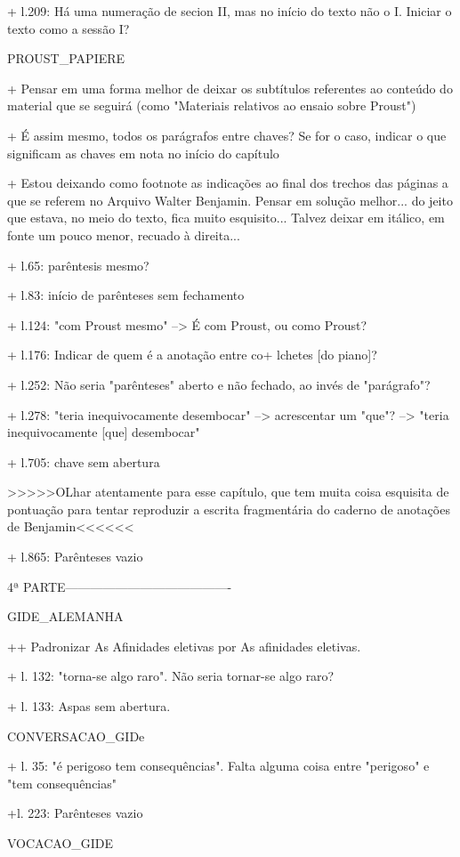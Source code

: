 + l.209: Há uma numeração de secion II, mas no início do texto não o I. Iniciar o texto como a sessão I?

PROUST_PAPIERE

+ Pensar em uma forma melhor de deixar os subtítulos referentes ao conteúdo do material que se seguirá (como "Materiais relativos ao ensaio sobre Proust")

+ É assim mesmo, todos os parágrafos entre chaves? Se for o caso, indicar o que significam as chaves em nota no início do capítulo

+ Estou deixando como footnote as indicações ao final dos trechos das páginas a que se referem no Arquivo Walter Benjamin. Pensar em solução melhor... do jeito que estava, no meio do texto, fica muito esquisito... Talvez deixar em itálico, em fonte um pouco menor, recuado à direita...

+ l.65: parêntesis mesmo?

+ l.83: início de parênteses sem fechamento

+ l.124: "com Proust mesmo" --> É com Proust, ou como Proust?

+ l.176: Indicar de quem é a anotação entre co+ lchetes [do piano]?

+ l.252: Não seria "parênteses" aberto e não fechado, ao invés de "parágrafo"?

+ l.278: "teria inequivocamente desembocar" --> acrescentar um "que"? --> "teria inequivocamente [que] desembocar"

+ l.705: chave sem abertura

>>>>>OLhar atentamente para esse capítulo, que tem muita coisa esquisita de pontuação para tentar reproduzir a escrita fragmentária do caderno de anotações de Benjamin<<<<<<

+ l.865: Parênteses vazio

4ª PARTE----------------------------------------

GIDE_ALEMANHA

++ Padronizar As Afinidades eletivas por As afinidades eletivas.

+ l. 132: "torna-se algo raro". Não seria tornar-se algo raro?

+ l. 133: Aspas sem abertura.

CONVERSACAO_GIDe

+ l. 35: "é perigoso tem consequências". Falta alguma coisa entre "perigoso" e "tem consequências"

+l. 223: Parênteses vazio

VOCACAO_GIDE

